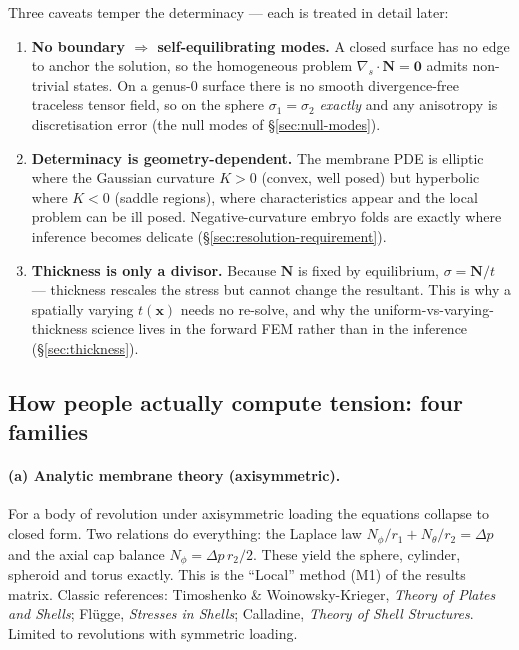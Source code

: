 \documentclass[11pt]{article}
\newcommand{\vv}[1]{\bm{#1}}          %
\newcommand{\Nb}{\mathbf{N}}           %
\newcommand{\divs}{\nabla_{\!s}\!\cdot}
\begin{document}
Three caveats temper the determinacy — each is treated in detail later:
\begin{enumerate}[label=(\roman*),nosep]
  \item \textbf{No boundary $\Rightarrow$ self-equilibrating modes.}  A closed
        surface has no edge to anchor the solution, so the homogeneous problem
        $\divs\Nb=\vv0$ admits non-trivial states.  On a genus-0 surface there is
        no smooth divergence-free traceless tensor field, so on the sphere
        $\sigma_1=\sigma_2$ \emph{exactly} and any anisotropy is discretisation
        error (the null modes of \S\ref{sec:null-modes}).
  \item \textbf{Determinacy is geometry-dependent.}  The membrane PDE is elliptic
        where the Gaussian curvature $K>0$ (convex, well posed) but hyperbolic
        where $K<0$ (saddle regions), where characteristics appear and the local
        problem can be ill posed.  Negative-curvature embryo folds are exactly
        where inference becomes delicate
        (\S\ref{sec:resolution-requirement}).
  \item \textbf{Thickness is only a divisor.}  Because $\Nb$ is fixed by
        equilibrium, $\sigma=\Nb/t$ — thickness rescales the stress but cannot
        change the resultant.  This is why a spatially varying $t(\vv x)$ needs no
        re-solve, and why the uniform-vs-varying-thickness science lives in the
        forward FEM rather than in the inference (\S\ref{sec:thickness}).
\end{enumerate}

\subsection{How people actually compute tension: four families}
\label{sec:el-methods}

\paragraph{(a) Analytic membrane theory (axisymmetric).}
For a body of revolution under axisymmetric loading the equations collapse to
closed form.  Two relations do everything: the Laplace law
$N_\phi/r_1+N_\theta/r_2=\Delta p$ and the axial cap balance
$N_\phi=\Delta p\,r_2/2$.  These yield the sphere, cylinder, spheroid and torus
exactly.  This is the ``Local'' method (M1) of the results matrix.  Classic
references: Timoshenko \& Woinowsky-Krieger, \emph{Theory of Plates and Shells};
Fl\"ugge, \emph{Stresses in Shells}; Calladine, \emph{Theory of Shell
Structures}.  Limited to revolutions with symmetric loading.
\end{document}
